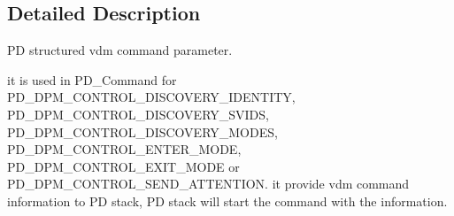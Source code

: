 \subsection{Detailed Description}
P\-D structured vdm command parameter. 

it is used in P\-D\-\_\-\-Command for P\-D\-\_\-\-D\-P\-M\-\_\-\-C\-O\-N\-T\-R\-O\-L\-\_\-\-D\-I\-S\-C\-O\-V\-E\-R\-Y\-\_\-\-I\-D\-E\-N\-T\-I\-T\-Y, P\-D\-\_\-\-D\-P\-M\-\_\-\-C\-O\-N\-T\-R\-O\-L\-\_\-\-D\-I\-S\-C\-O\-V\-E\-R\-Y\-\_\-\-S\-V\-I\-D\-S, P\-D\-\_\-\-D\-P\-M\-\_\-\-C\-O\-N\-T\-R\-O\-L\-\_\-\-D\-I\-S\-C\-O\-V\-E\-R\-Y\-\_\-\-M\-O\-D\-E\-S, P\-D\-\_\-\-D\-P\-M\-\_\-\-C\-O\-N\-T\-R\-O\-L\-\_\-\-E\-N\-T\-E\-R\-\_\-\-M\-O\-D\-E, P\-D\-\_\-\-D\-P\-M\-\_\-\-C\-O\-N\-T\-R\-O\-L\-\_\-\-E\-X\-I\-T\-\_\-\-M\-O\-D\-E or P\-D\-\_\-\-D\-P\-M\-\_\-\-C\-O\-N\-T\-R\-O\-L\-\_\-\-S\-E\-N\-D\-\_\-\-A\-T\-T\-E\-N\-T\-I\-O\-N. it provide vdm command information to P\-D stack, P\-D stack will start the command with the information. 

